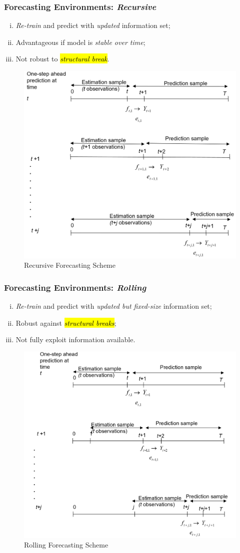 \documentclass[11pt]{article}
\begin{document}
		\subsubsection{Forecasting Environments: \emph{Recursive}}
			\begin{enumerate}[(i)]
				\item \emph{Re-train} and predict with \emph{updated} information set;
				\item Advantageous if model is \emph{stable over time};
				\item Not robust to \hl{\emph{structural break}}. 
			\end{enumerate}
			\begin{figure}[H]
				\centering
				\includegraphics[width=0.5\linewidth]{figures/recursive_forecast}
				\caption{Recursive Forecasting Scheme}
			\end{figure}
		\subsubsection{Forecasting Environments: \emph{Rolling}}
			\begin{enumerate}[(i)]
				\item \emph{Re-train} and predict with \emph{updated but fixed-size} information set;
				\item Robust against \hl{\emph{structural breaks}};
				\item Not fully exploit information available.
			\end{enumerate}
			\begin{figure}[H]
				\centering
				\includegraphics[width=0.5\linewidth]{figures/rolling_forecast}
				\caption{Rolling Forecasting Scheme}
			\end{figure}
\end{document}

